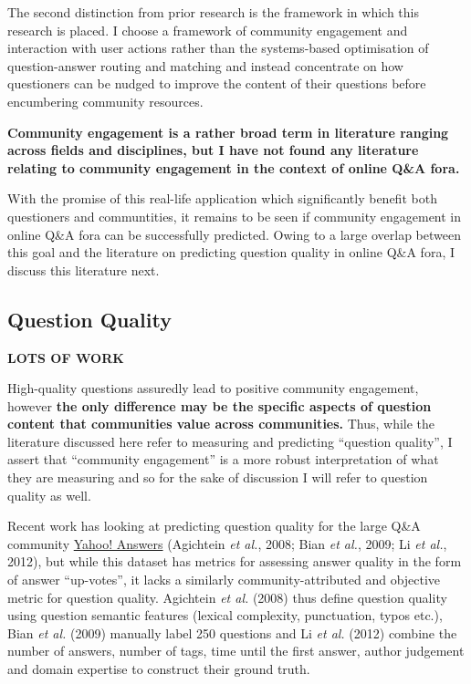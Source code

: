 \documentclass[11pt,preprint, authoryear]{article}
\numberwithin{equation}{section}
\begin{document}
The second distinction from prior research is the framework in which
this research is placed. I choose a framework of community engagement
and interaction with user actions rather than the systems-based
optimisation of question-answer routing and matching and instead
concentrate on how questioners can be nudged to improve the content of
their questions before encumbering community resources.

\textbf{Community engagement is a rather broad term in literature
ranging across fields and disciplines, but I have not found any
literature relating to community engagement in the context of online
Q\&A fora.}

With the promise of this real-life application which significantly
benefit both questioners and communtities, it remains to be seen if
community engagement in online Q\&A fora can be successfully predicted.
Owing to a large overlap between this goal and the literature on
predicting question quality in online Q\&A fora, I discuss this
literature next.

\subsection{Question Quality}\label{question-quality}

\textbf{LOTS OF WORK}

High-quality questions assuredly lead to positive community engagement,
however \textbf{the only difference may be the specific aspects of
question content that communities value across communities.} Thus, while
the literature discussed here refer to measuring and predicting
``question quality'', I assert that ``community engagement'' is a more
robust interpretation of what they are measuring and so for the sake of
discussion I will refer to question quality as well.

Recent work has looking at predicting question quality for the large
Q\&A community \href{http://answers.yahoo.com}{Yahoo! Answers}
(Agichtein \emph{et al.}, 2008; Bian \emph{et al.}, 2009; Li \emph{et
al.}, 2012), but while this dataset has metrics for assessing answer
quality in the form of answer ``up-votes'', it lacks a similarly
community-attributed and objective metric for question quality.
Agichtein \emph{et al.} (2008) thus define question quality using
question semantic features (lexical complexity, punctuation, typos
etc.), Bian \emph{et al.} (2009) manually label 250 questions and Li
\emph{et al.} (2012) combine the number of answers, number of tags, time
until the first answer, author judgement and domain expertise to
construct their ground truth.
\end{document}
